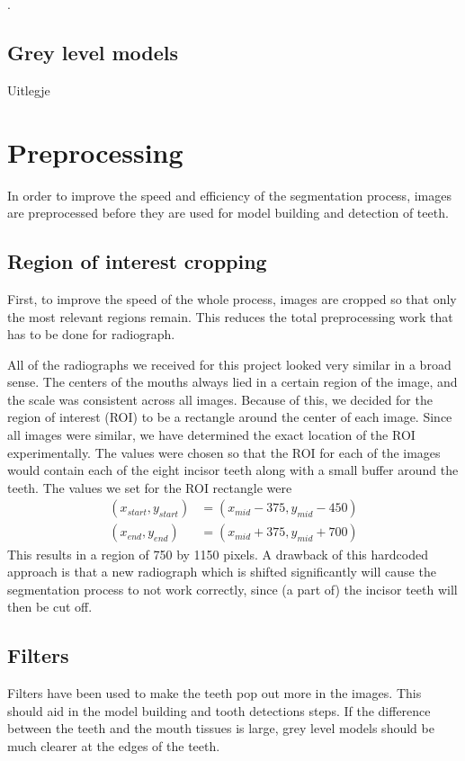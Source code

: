 \documentclass[a4paper]{article}
\begin{document}
\cite{Cootes1992AnIT}.

\subsection{Grey level models}
Uitlegje


\section{Preprocessing}
\label{sect:preprocessing}
In order to improve the speed and efficiency of the segmentation process, images are preprocessed before they are used for model building and detection of teeth.

\subsection{Region of interest cropping}
First, to improve the speed of the whole process, images are cropped so that only the most relevant regions remain. This reduces the total preprocessing work that has to be done for radiograph.

All of the radiographs we received for this project looked very similar in a broad sense. 
The centers of the mouths always lied in a certain region of the image, and the scale was consistent across all images.
Because of this, we decided for the region of interest (ROI) to be a rectangle around the center of each image.
Since all images were similar, we have determined the exact location of the ROI experimentally.
The values were chosen so that the ROI for each of the images would contain each of the eight incisor teeth along with a small buffer around the teeth.
The values we set for the ROI rectangle were 
\begin{align} 
(x_{start}, y_{start}) &= (x_{mid} - 375, y_{mid} - 450) \\ 
(x_{end}, y_{end})     &= (x_{mid} + 375, y_{mid} + 700)
\end{align}
This results in a region of 750 by 1150 pixels. A drawback of this hardcoded approach is that a new radiograph which is shifted significantly will cause the segmentation process to not work correctly, since (a part of) the incisor teeth will then be cut off.

\subsection{Filters}
Filters have been used to make the teeth pop out more in the images.
This should aid in the model building and tooth detections steps.
If the difference between the teeth and the mouth tissues is large, grey level models should be much clearer at the edges of the teeth. 
\end{document}
